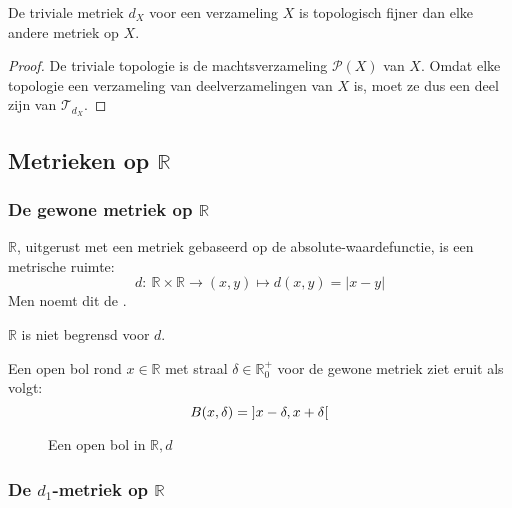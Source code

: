 \documentclass[main.tex]{subfiles}
\begin{document}
\begin{st}
  De triviale metriek $d_{X}$ voor een verzameling $X$ is topologisch fijner dan elke andere metriek op $X$.

  \begin{proof}
    De triviale topologie is de machtsverzameling $\mathcal{P}(X)$ van $X$.
    Omdat elke topologie een verzameling van deelverzamelingen van $X$ is, moet ze dus een deel zijn van $\mathcal{T}_{d_{X}}$.
  \end{proof}
\end{st}

\subsection{Metrieken op $\mathbb{R}$}
\label{sec:metrieken-op-mathbbr}

\subsubsection{De gewone metriek op $\mathbb{R}$}
\label{sec:de-gewone-metriek}

\begin{vb}
  $\mathbb{R}$, uitgerust met een metriek gebaseerd op de absolute-waardefunctie, is een metrische ruimte:
  \[ d:\ \mathbb{R}\times\mathbb{R}\rightarrow (x,y) \mapsto d(x,y)=|x-y| \]
  Men noemt dit de .
\end{vb}

\begin{opm}
  $\mathbb{R}$ is niet begrensd voor $d$.
\end{opm}

\begin{vb}
  Een open bol rond $x\in \mathbb{R}$ met straal $\delta\in \mathbb{R}_{0}^{+}$ voor de gewone metriek ziet eruit als volgt:
  \[ B(x,\delta) = \interval[open]{x-\delta}{x+\delta} \]
  \begin{figure}[H]
    \centering
    \caption{Een open bol in $\mathbb{R},d$}
  \end{figure}
\end{vb}


\subsubsection{De $d_1$-metriek op $\mathbb{R}$}
\label{sec:d_1-metriek-op}
\end{document}

